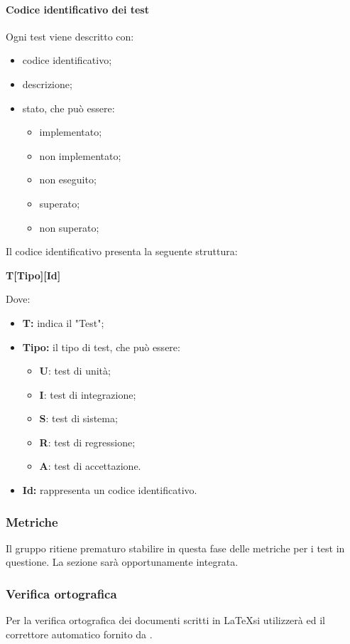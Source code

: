\paragraph{Codice identificativo dei test}
Ogni test viene descritto con:
\begin{itemize}
	\item codice identificativo;
	\item descrizione;
	\item stato, che può essere:
	\begin{itemize}
		\item implementato;
		\item non implementato;
		\item non eseguito;
		\item superato;
		\item non superato;
	\end{itemize}
\end{itemize}
Il codice identificativo presenta la seguente struttura:\newline
\centerline{\textbf{T[Tipo][Id]}}
\newline
Dove:
\begin{itemize}
	\item \textbf{T:} indica il "Test";
	\item \textbf{Tipo:} il tipo di test, che può essere:
	\begin{itemize}
		\item \textbf{U}: test di unità;
		\item \textbf{I}: test di integrazione;
		\item \textbf{S}: test di sistema;
		\item \textbf{R}: test di regressione;
		\item \textbf{A}: test di accettazione.
	\end{itemize}
	\item \textbf{Id:} rappresenta un codice identificativo.
\end{itemize}

\subsubsection{Metriche}
Il gruppo ritiene prematuro stabilire in questa fase delle metriche per i test in questione. La sezione sarà opportunamente integrata.
\subsubsection{Verifica ortografica}
Per la verifica ortografica dei documenti scritti in \LaTeX si utilizzerà  ed il correttore automatico fornito da .
